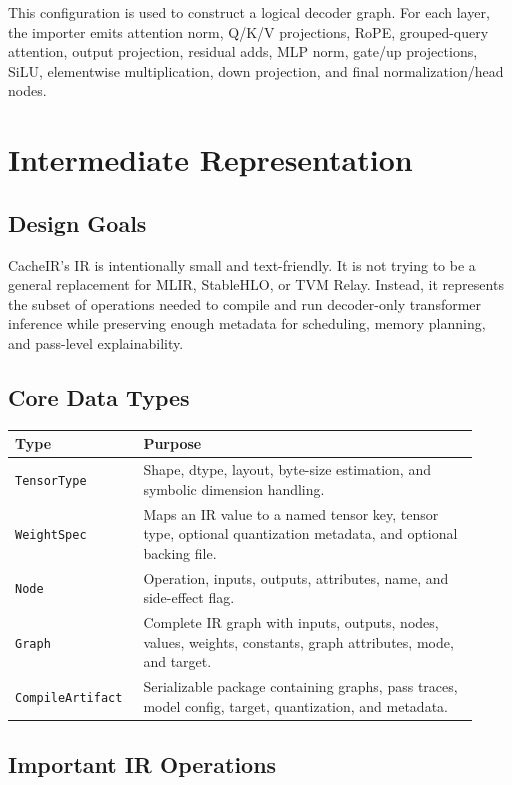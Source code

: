 \documentclass[11pt]{article}
\begin{document}
This configuration is used to construct a logical decoder graph. For each layer,
the importer emits attention norm, Q/K/V projections, RoPE, grouped-query
attention, output projection, residual adds, MLP norm, gate/up projections, SiLU,
elementwise multiplication, down projection, and final normalization/head nodes.

\section{Intermediate Representation}

\subsection{Design Goals}

CacheIR's IR is intentionally small and text-friendly. It is not trying to be a
general replacement for MLIR, StableHLO, or TVM Relay. Instead, it represents the
subset of operations needed to compile and run decoder-only transformer inference
while preserving enough metadata for scheduling, memory planning, and pass-level
explainability.

\subsection{Core Data Types}

\begin{longtable}{p{0.24\linewidth}p{0.68\linewidth}}
\toprule
\textbf{Type} & \textbf{Purpose} \\
\midrule
\texttt{TensorType} & Shape, dtype, layout, byte-size estimation, and symbolic
dimension handling. \\
\texttt{WeightSpec} & Maps an IR value to a named tensor key, tensor type,
optional quantization metadata, and optional backing file. \\
\texttt{Node} & Operation, inputs, outputs, attributes, name, and side-effect
flag. \\
\texttt{Graph} & Complete IR graph with inputs, outputs, nodes, values, weights,
constants, graph attributes, mode, and target. \\
\texttt{CompileArtifact} & Serializable package containing graphs, pass traces,
model config, target, quantization, and metadata. \\
\bottomrule
\end{longtable}

\subsection{Important IR Operations}
\end{document}
